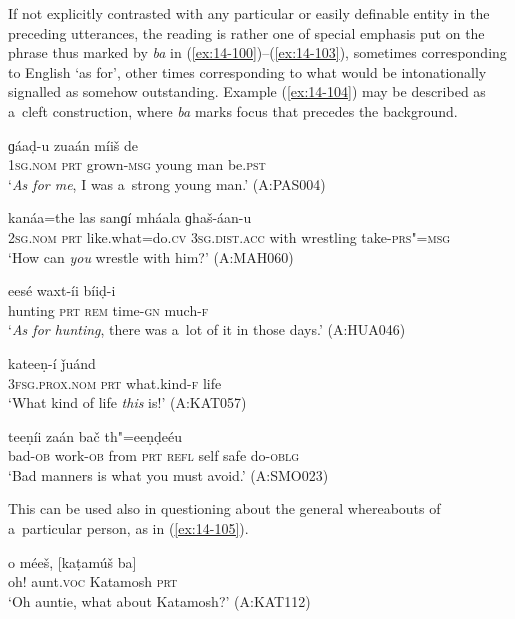 If not explicitly contrasted with any particular or easily definable entity in the preceding utterances, the reading is rather one of special emphasis put on the phrase thus marked by \textit{ba} in (\ref{ex:14-100})--(\ref{ex:14-103}), sometimes corresponding to English `as for', other times corresponding to what would be intonationally signalled as somehow outstanding. Example (\ref{ex:14-104}) may be described as a~cleft construction, where \textit{ba} marks focus that precedes the background.

\begin{exe}
\ex
\label{ex:14-100}
\gll [ma ba] ɡáaḍ-u zuaán míiš de \\
\textsc{1sg.nom} \textsc{prt} grown-\textsc{msg} young man be.\textsc{pst}  \\
\glt `\textit{As for me}, I was a~strong young man.' (A:PAS004)

\ex
\label{ex:14-101}
\gll [tu ba] kanáa=the las sanɡí  mháala ɡhaš-áan-u \\
\textsc{2sg.nom} \textsc{prt} like.what=do.\textsc{cv} \textsc{3sg.dist.acc} with wrestling take-\textsc{prs"=msg }\\
\glt `How can \textit{you} wrestle with him?' (A:MAH060)

\ex
\label{ex:14-102}
\gll [neečíir ba] eesé waxt-íi bíiḍ-i \\
hunting \textsc{prt} \textsc{rem} time-\textsc{gn} much-\textsc{f } \\
\glt `\textit{As for hunting}, there was a~lot of it in those days.' (A:HUA046)

\ex
\label{ex:14-103}
\gll [aní ba] kateeṇ-í ǰuánd \\
\textsc{3fsg.prox.nom} \textsc{prt} what.kind-\textsc{f} life  \\
\glt `What kind of life \textit{this} is!' (A:KAT057)

\ex
\label{ex:14-104}
 teeṇíi zaán bač th"=eeṇḍeéu \\
bad-\textsc{ob} work-\textsc{ob } from \textsc{prt} \textsc{refl} self safe do-\textsc{oblg} \\
\glt `Bad manners is what you must avoid.' (A:SMO023)
\end{exe}

This can be used also in questioning about the general whereabouts of a~particular person, as in (\ref{ex:14-105}).

\begin{exe}
\ex
\label{ex:14-105}
\gll o méeš, [kaṭamúš ba] \\
oh! aunt.\textsc{voc} Katamosh \textsc{prt } \\
\glt `Oh auntie, what about Katamosh?' (A:KAT112)
\end{exe}

